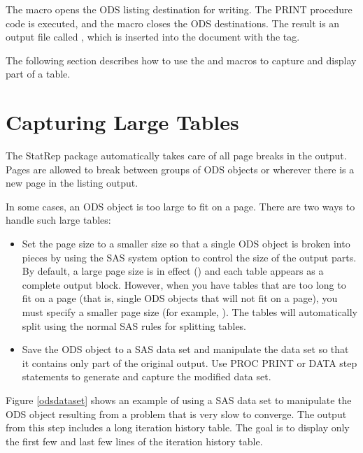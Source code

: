 \documentclass[article,oneside]{memoir}
\newcommand*{\StatRep}{\textsf{StatRep}\xspace}
\begin{document}
  The  macro opens the ODS listing destination for writing. 
  The PRINT procedure code is executed, and the  macro closes the ODS destinations. 
  The result is an output file called , which is
  inserted into the document with the  tag. 
  
  The following section describes how to use the  and 
  macros to capture and display part of a table.
  
\section{Capturing Large Tables}\label{large}
 
  The \StatRep package automatically takes care of all page breaks in the output. 
  Pages are allowed to break between groups of ODS objects or wherever there is a new page 
  in the listing output. 
  
  In some cases, an ODS object is too large to fit on a page.
  There are two ways to handle such large tables:
  \begin{itemize}
  \item Set the page size to a smaller size so that a single ODS object is broken into pieces
  by using the SAS system option to control the size of the output parts.
  By default, a large page size is
  in effect () and each table appears 
  as a complete output block. However, when you have tables that are 
  too long to fit on a page (that is, single ODS objects that will not fit on a page), 
  you must specify a smaller page size 
  (for example, ).
  The tables will automatically split using the normal SAS
  rules for splitting tables. 
  
  \item Save the ODS object to a SAS data set and manipulate the data set
  so that it contains only part of the original output. Use PROC PRINT 
  or DATA step statements to generate and capture the modified data set.
  
  \end{itemize}
  
  Figure \ref{odsdataset} shows an
  example of using a SAS data set to manipulate
  the ODS object resulting from a problem that is very 
  slow to converge. The output from this step includes a long iteration 
  history table. 
  The goal is to display only the first few and last few lines of 
  the iteration history table.
\end{document}
